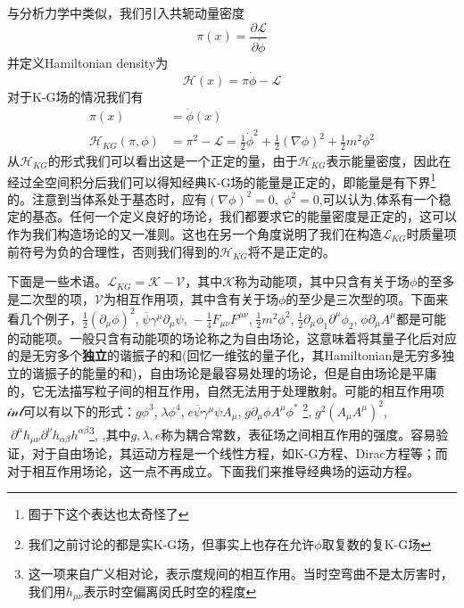 与分析力学中类似，我们引入共轭动量密度
\begin{equation}
    \pi(x)=\frac{\partial \mathcal{L}}{\partial \dot{\phi}}
\end{equation}
并定义Hamiltonian density为
\begin{equation}
    \mathcal{H}(x)=\pi\dot{\phi}-\mathcal{L}
\end{equation}
对于K-G场的情况我们有
\begin{equation}
\begin{aligned}
    \pi(x)&=\dot{\phi}(x) \\
    \mathcal{H}_{KG}(\pi,\phi)&=\pi^{2}-\mathcal{L}=\frac{1}{2}\dot{\phi}^{2}+\frac{1}{2}(\nabla\phi)^{2}+\frac{1}{2}m^{2}\phi^{2}
  \end{aligned}  
\end{equation}
从$\mathcal{H}_{KG}$的形式我们可以看出这是一个正定的量，由于$\mathcal{H}_{KG}$表示能量密度，因此在经过全空间积分后我们可以得知经典K-G场的能量是正定的，即能量是有下界\footnote{囿于下这个表达也太奇怪了}的。注意到当体系处于基态时，应有$(\nabla \phi)^{2}=0,\;\phi^{2}=0$,可以认为,体系有一个稳定的基态。任何一个定义良好的场论，我们都要求它的能量密度是正定的，这可以作为我们构造场论的又一准则。这也在另一个角度说明了我们在构造$\mathcal{L}_{KG}$时质量项前符号为负的合理性，否则我们得到的$\mathcal{H}_{KG}$将不是正定的。

下面是一些术语。$\mathcal{L}_{KG}=\mathcal{K}-\mathcal{V}$，其中$\mathcal{K}$称为动能项，其中只含有关于场$\phi$的至多是二次型的项，$\mathcal{V}$为相互作用项，其中含有关于场$\phi$的至少是三次型的项。下面来看几个例子，$\frac{1}{2}(\partial_{\mu}\phi)^{2}$,$\;\overline{\psi}\gamma^{\mu}\partial_{\mu}\psi$,$\;-\frac{1}{4}F_{\mu\nu}F^{\mu\nu}$,$\;\frac{1}{2}m^{2}\phi^{2}$,$\;\frac{1}{2}\partial_{\mu}\phi_{1}\partial^{\mu}\phi_{2}$,$\;\phi\partial_{\mu}A^{\mu}$都是可能的动能项。一般只含有动能项的场论称之为自由场论，这意味着将其量子化后对应的是无穷多个\textbf{独立}的谐振子的和(回忆一维弦的量子化，其Hamiltonian是无穷多独立的谐振子的能量的和)，自由场论是最容易处理的场论，但是自由场论是平庸的，它无法描写粒子间的相互作用，自然无法用于处理散射。可能的相互作用项$\mathcal{int}$可以有以下的形式：$g \phi^{3}$,$\;\lambda \phi^{4}$,$\;e\overline{\psi}\gamma^{\mu}\psi A_{\mu}$,$\;g\partial_{\mu}\phi A^{\mu} \phi^{*}$ \footnote{我们之前讨论的都是实K-G场，但事实上也存在允许$\phi$取复数的复K-G场},$\;g^{2}(A_{\mu}A^{\mu})^{2}$,$\;\partial^{\mu}h_{\mu\nu}\partial^{\nu}h_{\alpha \beta}h^{\alpha\beta}$\footnote{这一项来自广义相对论，表示度规间的相互作用。当时空弯曲不是太厉害时，我们用$h_{\mu\nu}$表示时空偏离闵氏时空的程度},
,其中$g,\lambda,e$称为耦合常数，表征场之间相互作用的强度。容易验证，对于自由场论，其运动方程是一个线性方程，如K-G方程、Dirac方程等；而对于相互作用场论，这一点不再成立。下面我们来推导经典场的运动方程。

